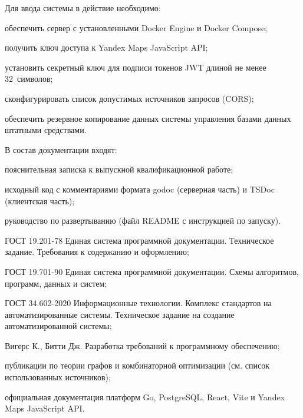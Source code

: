 Для ввода системы в действие необходимо:
\begin{compactlist}
  \item обеспечить сервер с установленными Docker Engine и Docker Compose;
  \item получить ключ доступа к Yandex Maps JavaScript API;
  \item установить секретный ключ для подписи токенов JWT длиной не менее 32~символов;
  \item сконфигурировать список допустимых источников запросов (CORS);
  \item обеспечить резервное копирование данных системы управления базами данных штатными средствами.
\end{compactlist}

В состав документации входят:
\begin{compactlist}
  \item пояснительная записка к выпускной квалификационной работе;
  \item исходный код с комментариями формата godoc (серверная часть) и TSDoc (клиентская часть);
  \item руководство по развертыванию (файл README с инструкцией по запуску).
\end{compactlist}

\begin{compactlist}
  \item ГОСТ 19.201-78 Единая система программной документации. Техническое задание. Требования к содержанию и оформлению;
  \item ГОСТ 19.701-90 Единая система программной документации. Схемы алгоритмов, программ, данных и систем;
  \item ГОСТ 34.602-2020 Информационные технологии. Комплекс стандартов на автоматизированные системы. Техническое задание на создание автоматизированной системы;
  \item Вигерс К., Битти Дж. Разработка требований к программному обеспечению;
  \item публикации по теории графов и комбинаторной оптимизации (см. список использованных источников);
  \item официальная документация платформ Go, PostgreSQL, React, Vite и Yandex Maps JavaScript API.
\end{compactlist}

\label{tz:end}
